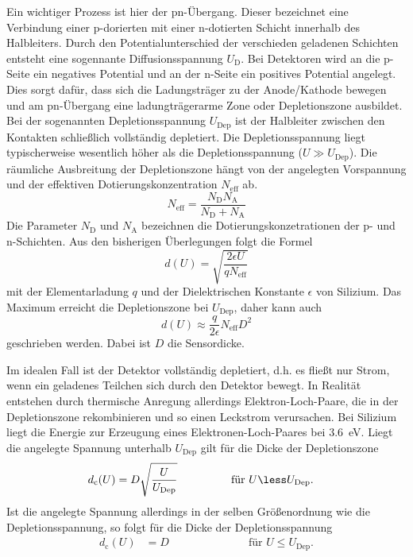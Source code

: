 Ein wichtiger Prozess ist hier der pn-Übergang. Dieser bezeichnet eine Verbindung
einer p-dorierten mit einer n-dotierten Schicht innerhalb des Halbleiters. Durch den
Potentialunterschied der verschieden geladenen Schichten entsteht eine sogennante
Diffusionsspannung $U_\text{D}$. Bei Detektoren wird an die p-Seite ein negatives
Potential und an der n-Seite ein positives Potential angelegt. Dies sorgt dafür,
dass sich die Ladungsträger zu der Anode/Kathode bewegen und am pn-Übergang eine
ladungträgerarme Zone oder Depletionszone ausbildet.
Bei der sogenannten Depletionsspannung $U_\text{Dep}$ ist der Halbleiter zwischen den
Kontakten schließlich vollständig depletiert.
Die Depletionsspannung liegt typischerweise wesentlich höher als die
Depletionsspannung ($U \gg U_\text{Dep}$). Die räumliche Ausbreitung der Depletionszone
hängt von der angelegten Vorspannung und der effektiven Dotierungskonzentration
$N_\text{eff}$ ab.
\begin{equation}
  N_\text{eff} = \frac{N_\text{D}N_\text{A}}{N_\text{D}+N_\text{A}}
\end{equation}
Die Parameter $N_\text{D}$ und $N_\text{A}$ bezeichnen die Dotierungskonzetrationen
der p- und n-Schichten.
Aus den bisherigen Überlegungen folgt die Formel
\begin{equation}
  d(U) = \sqrt{\frac{2\epsilon U}{q N_\text{eff}}}
\end{equation}
mit der Elementarladung $q$ und der Dielektrischen Konstante $\epsilon$ von
Silizium. Das Maximum erreicht die Depletionszone bei $U_\text{Dep}$, daher kann
auch
\begin{equation}
  d(U) \approx \frac{q}{2\epsilon} N_\text{eff}D^2
\end{equation}
geschrieben werden. Dabei ist $D$ die Sensordicke.

Im idealen Fall ist der Detektor vollständig depletiert, d.h. es fließt nur Strom,
wenn ein geladenes Teilchen sich durch den Detektor bewegt. In Realität entstehen
durch thermische Anregung allerdings Elektron-Loch-Paare, die in der Depletionszone
rekombinieren und so einen Leckstrom verursachen. Bei Silizium liegt die Energie
zur Erzeugung eines Elektronen-Loch-Paares bei \SI{3.6}{\electronvolt}.
Liegt die angelegte Spannung unterhalb $U_\text{Dep}$ gilt
für die Dicke der Depletionszone
\begin{align*}
  d_\text{c}(U) &= D\sqrt{\frac{U}{U_\text{Dep}}} \hspace{1.7cm}\text{für } U \less U_\text{Dep}.
\end{align*}
Ist die angelegte Spannung allerdings in der selben Größenordnung wie die Depletionsspannung,
 so folgt für die Dicke der Depletionsspannung
 \begin{align*}
   d_\text{c}(U) &= D \hspace{3cm}\text{für } U \le U_\text{Dep}.
 \end{align*}

